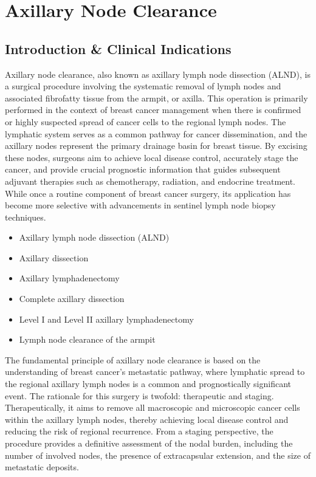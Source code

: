 \chapter{Axillary Node Clearance}

\section*{Introduction \& Clinical Indications}
Axillary node clearance, also known as axillary lymph node dissection (ALND), is a surgical procedure involving the systematic removal of lymph nodes and associated fibrofatty tissue from the armpit, or axilla. This operation is primarily performed in the context of breast cancer management when there is confirmed or highly suspected spread of cancer cells to the regional lymph nodes. The lymphatic system serves as a common pathway for cancer dissemination, and the axillary nodes represent the primary drainage basin for breast tissue. By excising these nodes, surgeons aim to achieve local disease control, accurately stage the cancer, and provide crucial prognostic information that guides subsequent adjuvant therapies such as chemotherapy, radiation, and endocrine treatment. While once a routine component of breast cancer surgery, its application has become more selective with advancements in sentinel lymph node biopsy techniques.

\begin{itemize}
  \item Axillary lymph node dissection (ALND)
  \item Axillary dissection
  \item Axillary lymphadenectomy
  \item Complete axillary dissection
  \item Level I and Level II axillary lymphadenectomy
  \item Lymph node clearance of the armpit
\end{itemize}

The fundamental principle of axillary node clearance is based on the understanding of breast cancer's metastatic pathway, where lymphatic spread to the regional axillary lymph nodes is a common and prognostically significant event. The rationale for this surgery is twofold: therapeutic and staging. Therapeutically, it aims to remove all macroscopic and microscopic cancer cells within the axillary lymph nodes, thereby achieving local disease control and reducing the risk of regional recurrence. From a staging perspective, the procedure provides a definitive assessment of the nodal burden, including the number of involved nodes, the presence of extracapsular extension, and the size of metastatic deposits.

